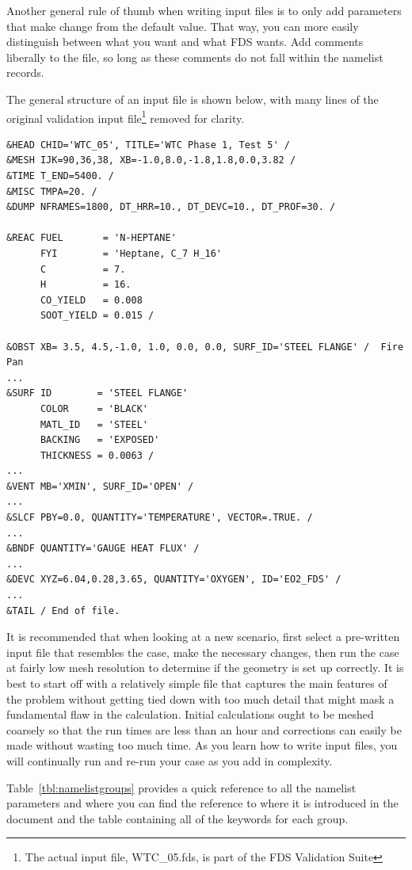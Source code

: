 \documentclass[11pt]{book}
\begin{document}
Another general rule of thumb when writing input files is to only add parameters that make change from the
default value. That way, you can more easily distinguish between what you want and what FDS wants.
Add comments liberally to the file, so long as
these comments do not fall within the namelist records.

The general structure of an input file is shown below, with many
lines of the original validation input file\footnote{The actual input file, WTC\_05.fds, is part of the FDS
Validation Suite} removed for clarity.

\begin{lstlisting}
&HEAD CHID='WTC_05', TITLE='WTC Phase 1, Test 5' /
&MESH IJK=90,36,38, XB=-1.0,8.0,-1.8,1.8,0.0,3.82 /
&TIME T_END=5400. /
&MISC TMPA=20. /
&DUMP NFRAMES=1800, DT_HRR=10., DT_DEVC=10., DT_PROF=30. /

&REAC FUEL       = 'N-HEPTANE'
      FYI        = 'Heptane, C_7 H_16'
      C          = 7.
      H          = 16.
      CO_YIELD   = 0.008
      SOOT_YIELD = 0.015 /

&OBST XB= 3.5, 4.5,-1.0, 1.0, 0.0, 0.0, SURF_ID='STEEL FLANGE' /  Fire Pan
...
&SURF ID        = 'STEEL FLANGE'
      COLOR     = 'BLACK'
      MATL_ID   = 'STEEL'
      BACKING   = 'EXPOSED'
      THICKNESS = 0.0063 /
...
&VENT MB='XMIN', SURF_ID='OPEN' /
...
&SLCF PBY=0.0, QUANTITY='TEMPERATURE', VECTOR=.TRUE. /
...
&BNDF QUANTITY='GAUGE HEAT FLUX' /
...
&DEVC XYZ=6.04,0.28,3.65, QUANTITY='OXYGEN', ID='EO2_FDS' /
...
&TAIL / End of file.
\end{lstlisting}
It is recommended that when looking at a new scenario,
first select a pre-written input file that resembles the case,
make the necessary changes, then run the case at fairly low
mesh resolution to determine if the geometry is set up correctly.
It is best to start off with a relatively simple file that captures the main
features of the problem without getting tied down with too much detail that
might mask a fundamental flaw in the calculation. Initial calculations ought
to be meshed coarsely so that the run times are less than an hour and
corrections can easily be made without wasting too much time.
As you learn how to write input files, you will continually
run and re-run your case as you add in complexity.

Table~\ref{tbl:namelistgroups} provides a quick reference to all the namelist parameters and
where you can find the reference to where it is introduced in the document and the
table containing all of the keywords for each group.
\end{document}
